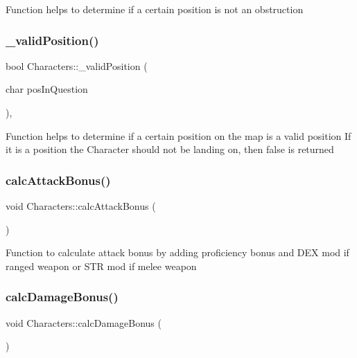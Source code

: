 Function helps to determine if a certain position is not an obstruction \hypertarget{class_characters_ab509433a15fb7604b2080e0568e41d0d}{}\label{class_characters_ab509433a15fb7604b2080e0568e41d0d} 
\subsubsection{\texorpdfstring{\+\_\+valid\+Position()}{\_validPosition()}}
{\footnotesize\ttfamily bool Characters\+::\+\_\+valid\+Position (\begin{DoxyParamCaption}\item[{char}]{pos\+In\+Question }\end{DoxyParamCaption})\hspace{0.3cm}{\ttfamily [static]}, {\ttfamily [protected]}}

Function helps to determine if a certain position on the map is a valid position If it is a position the Character should not be landing on, then false is returned \hypertarget{class_characters_aafcca03cc72ce2b389c0412229864c6e}{}\label{class_characters_aafcca03cc72ce2b389c0412229864c6e} 
\subsubsection{\texorpdfstring{calc\+Attack\+Bonus()}{calcAttackBonus()}}
{\footnotesize\ttfamily void Characters\+::calc\+Attack\+Bonus (\begin{DoxyParamCaption}{ }\end{DoxyParamCaption})}

Function to calculate attack bonus by adding proficiency bonus and D\+EX mod if ranged weapon or S\+TR mod if melee weapon \hypertarget{class_characters_af750209704e0be8b911cbc29fc1362ee}{}\label{class_characters_af750209704e0be8b911cbc29fc1362ee} 
\subsubsection{\texorpdfstring{calc\+Damage\+Bonus()}{calcDamageBonus()}}
{\footnotesize\ttfamily void Characters\+::calc\+Damage\+Bonus (\begin{DoxyParamCaption}{ }\end{DoxyParamCaption})}

